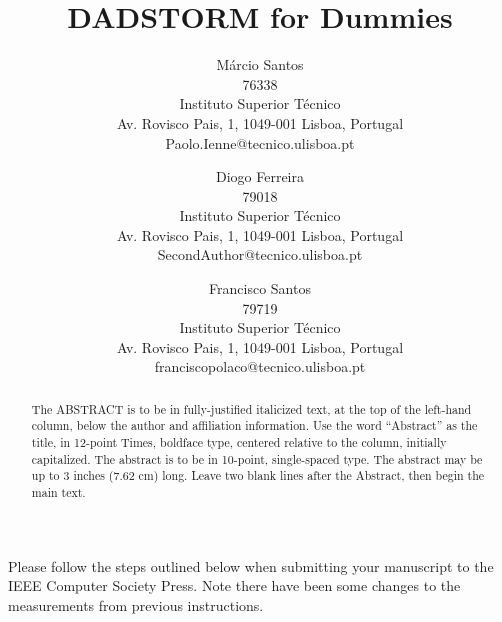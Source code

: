 \documentclass[times, 10pt,twocolumn]{article}
\begin{document}
\title{DADSTORM 
       for Dummies}

\author{Márcio Santos\\
76338\\ Instituto Superior Técnico \\ Av. Rovisco Pais, 1, 1049-001 Lisboa, Portugal\\ Paolo.Ienne@tecnico.ulisboa.pt\\
\and
Diogo Ferreira\\
79018\\
Instituto Superior Técnico\\ Av. Rovisco Pais, 1, 1049-001 Lisboa, Portugal\\ 
SecondAuthor@tecnico.ulisboa.pt\\
\and
Francisco Santos\\
79719\\
Instituto Superior Técnico\\ Av. Rovisco Pais, 1, 1049-001 Lisboa, Portugal\\ 
franciscopolaco@tecnico.ulisboa.pt\\}

\maketitle
\thispagestyle{empty}

\begin{abstract}
   The ABSTRACT is to be in fully-justified italicized text, at the top 
   of the left-hand column, below the author and affiliation 
   information. Use the word ``Abstract'' as the title, in 12-point 
   Times, boldface type, centered relative to the column, initially 
   capitalized. The abstract is to be in 10-point, single-spaced type. 
   The abstract may be up to 3 inches (7.62 cm) long. Leave two blank 
   lines after the Abstract, then begin the main text. 
\end{abstract}




Please follow the steps outlined below when submitting your 
manuscript to the IEEE Computer Society Press. Note there have 
been some changes to the measurements from previous instructions. 
\end{document}
